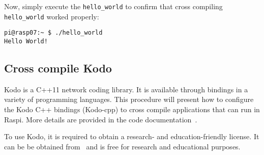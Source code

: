 Now, simply execute the \texttt{hello\_world} to confirm that cross compiling
\texttt{hello\_world} worked properly:

\begin{lstlisting}[]
pi@rasp07:~ $ ./hello_world
Hello World!
\end{lstlisting}
\FloatBarrier
\vspace{-5mm}

\subsection{Cross compile Kodo}

Kodo is a C++11 network coding library. It is available through bindings in
a variety of programming languages.
This procedure will present how to configure the Kodo C++ bindings (Kodo-cpp)
to cross compile applications that can run in \ac{Raspi}. More details are
provided in the code documentation~\cite{kodocppdoc}.


To use Kodo, it is required to obtain a research- and
education-friendly license.
It can be be obtained from~\cite{steinwurflicenselink} and is free
for research and educational purposes.


